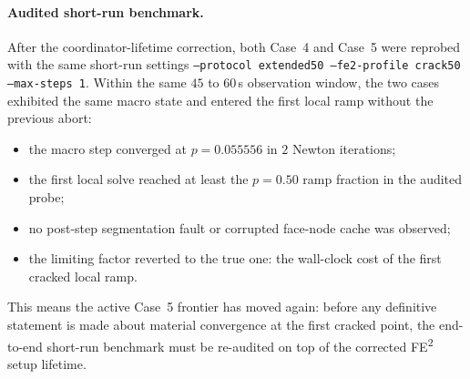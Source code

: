 \paragraph{Audited short-run benchmark.}
After the coordinator-lifetime correction, both Case~4 and Case~5 were
reprobed with the same short-run settings
\texttt{--protocol extended50 --fe2-profile crack50 --max-steps 1}.  Within the
same \(45\) to \(60\)\,s observation window, the two cases exhibited the same
macro state and entered the first local ramp without the previous abort:
\begin{itemize}
  \item the macro step converged at \(p = 0.055556\) in \(2\) Newton
    iterations;
  \item the first local solve reached at least the \(p=0.50\) ramp fraction in
    the audited probe;
  \item no post-step segmentation fault or corrupted face-node cache was
    observed;
  \item the limiting factor reverted to the true one: the wall-clock cost of
    the first cracked local ramp.
\end{itemize}
This means the active Case~5 frontier has moved again: before any definitive
statement is made about material convergence at the first cracked point, the
end-to-end short-run benchmark must be re-audited on top of the corrected
FE\textsuperscript{2} setup lifetime.

